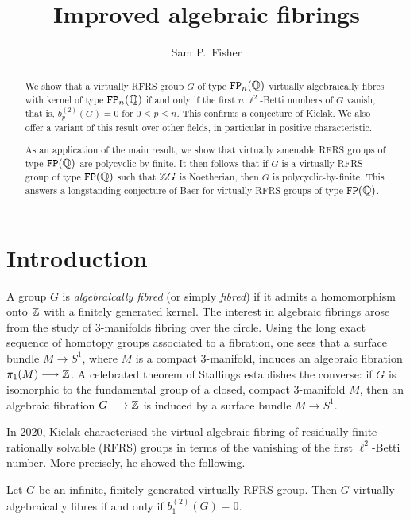 \documentclass[11pt, letterpaper]{amsart}
\title{Improved algebraic fibrings}
\author{Sam P.~Fisher}
\begin{document}
\maketitle

\begin{abstract}
We show that a virtually RFRS group $G$ of type $\mathtt{FP}_n(\mathbb{Q})$ virtually algebraically fibres with kernel of type $\mathtt{FP}_n(\mathbb{Q})$ if and only if the first $n$ $\ell^2$-Betti  numbers of $G$ vanish, that is, $b_p^{(2)}(G) = 0$ for $0 \leqslant p \leqslant n$. This confirms a conjecture of Kielak. We also offer a variant of this result over other fields, in particular in positive characteristic.

As an application of the main result, we show that virtually amenable RFRS groups of type $\mathtt{FP}(\mathbb{Q})$ are polycyclic-by-finite. It then follows that if $G$ is a virtually RFRS group of type $\mathtt{FP}(\mathbb{Q})$ such that $\mathbb{Z} G$ is Noetherian, then $G$ is polycyclic-by-finite. This answers a longstanding conjecture of Baer for virtually RFRS groups of type $\mathtt{FP}(\mathbb{Q})$.
\end{abstract}


\section{Introduction}

A group $G$ is \textit{algebraically fibred} (or simply \textit{fibred}) if it admits a homomorphism onto $\mathbb{Z}$ with a finitely generated kernel. The interest in algebraic fibrings arose from the study of $3$-manifolds fibring over the circle. Using the long exact sequence of homotopy groups associated to a fibration, one sees that a surface bundle $M \longrightarrow S^1$, where $M$ is a compact $3$-manifold, induces an algebraic fibration $\pi_1(M) \longrightarrow \mathbb{Z}$. A celebrated theorem of Stallings \cite{Stallings3mflds} establishes the converse: if $G$ is isomorphic to the fundamental group of a closed, compact $3$-manifold $M$, then an algebraic fibration $G \longrightarrow \mathbb{Z}$ is induced by a surface bundle $M \longrightarrow S^1$.

In 2020, Kielak characterised the virtual algebraic fibring of residually finite rationally solvable (RFRS) groups in terms of the vanishing of the first $\ell^2$-Betti number. More precisely, he showed the following.

\begin{thm} \label{thm:kielak}
Let $G$ be an infinite, finitely generated virtually RFRS group. Then $G$ virtually algebraically fibres if and only if $b_1^{(2)}(G) = 0$.
\end{thm}
\end{document}
